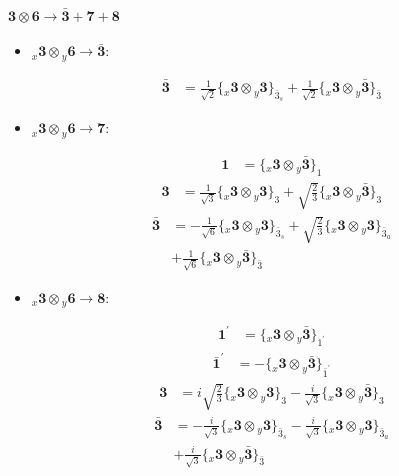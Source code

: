 \documentclass[english]{article}
\newcommand{\cgEqFontsize}{\large}
\newcommand{\rep}[1]{\mathbf{#1}}
\newcommand{\repx}[2]{{}_{#2}\mathbf{#1}}
\newcommand{\tsprod}[2]{\rep{#1}\otimes\rep{#2}}
\newcommand{\tsprodx}[2]{\repx{#1}{x}\otimes\repx{#2}{y}}
\newcommand{\subcgt}[3]{\big\{ \tsprodx{#1}{#2}\big\}^{}_{#3}}
\begin{document}
\paragraph*{\cgEqFontsize $\tsprod{3}{6}\to\rep{\bar{3}}+\rep{7}+\rep{8}$}
\begin{itemize}
\item $\tsprodx{3}{6}\to\rep{\bar{3}}$:
\begin{fleqn}
\begin{align*}
\rep{\bar{3}} & = \frac{1}{\sqrt{2}}\subcgt{3}{3}{\bar{3}_{s}}+\frac{1}{\sqrt{2}}\subcgt{3}{\bar{3}}{\bar{3}}
\end{align*}
\end{fleqn}
\item $\tsprodx{3}{6}\to\rep{7}$:
\begin{fleqn}
\begin{align*}
\rep{1} & = \subcgt{3}{\bar{3}}{1}
\end{align*}
\begin{align*}
\rep{3} & = \frac{1}{\sqrt{3}}\subcgt{3}{3}{3}+\sqrt{\frac{2}{3}}\subcgt{3}{\bar{3}}{3}
\end{align*}
\begin{align*}
\rep{\bar{3}} & = -\frac{1}{\sqrt{6}}\subcgt{3}{3}{\bar{3}_{s}}+\sqrt{\frac{2}{3}}\subcgt{3}{3}{\bar{3}_{a}} \\ 
 & +\frac{1}{\sqrt{6}}\subcgt{3}{\bar{3}}{\bar{3}}
\end{align*}
\end{fleqn}
\item $\tsprodx{3}{6}\to\rep{8}$:
\begin{fleqn}
\begin{align*}
\rep{1^{\prime}} & = \subcgt{3}{\bar{3}}{1^{\prime}}
\end{align*}
\begin{align*}
\rep{\bar{1}^{\prime}} & = -\subcgt{3}{\bar{3}}{\bar{1}^{\prime}}
\end{align*}
\begin{align*}
\rep{3} & = i \sqrt{\frac{2}{3}}\subcgt{3}{3}{3}-\frac{i}{\sqrt{3}}\subcgt{3}{\bar{3}}{3}
\end{align*}
\begin{align*}
\rep{\bar{3}} & = -\frac{i}{\sqrt{3}}\subcgt{3}{3}{\bar{3}_{s}}-\frac{i}{\sqrt{3}}\subcgt{3}{3}{\bar{3}_{a}} \\ 
 & +\frac{i}{\sqrt{3}}\subcgt{3}{\bar{3}}{\bar{3}}
\end{align*}
\end{fleqn}
\end{itemize}
\end{document}
